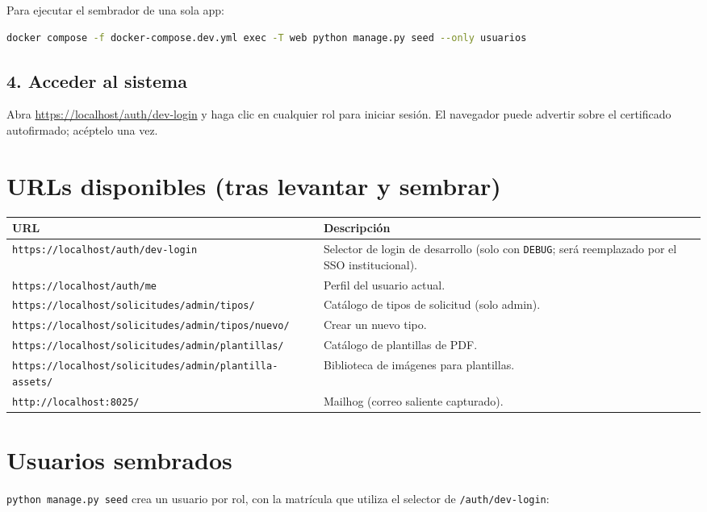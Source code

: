 \documentclass[12pt,letterpaper]{report}
\begin{document}
Para ejecutar el sembrador de una sola app:

\begin{lstlisting}[language=bash]
docker compose -f docker-compose.dev.yml exec -T web python manage.py seed --only usuarios
\end{lstlisting}

\subsection{4. Acceder al sistema}

Abra \url{https://localhost/auth/dev-login} y haga clic en cualquier rol para
iniciar sesión. El navegador puede advertir sobre el certificado autofirmado;
acéptelo una vez.

\section{URLs disponibles (tras levantar y sembrar)}

\begin{longtable}{L{7cm} L{7cm}}
\toprule
\textbf{URL} & \textbf{Descripción} \\
\midrule
\endhead
\texttt{https://localhost/auth/dev-login} & Selector de login de desarrollo
  (solo con \texttt{DEBUG}; será reemplazado por el SSO institucional). \\
\texttt{https://localhost/auth/me} & Perfil del usuario actual. \\
\texttt{https://localhost/solicitudes/admin/tipos/} & Catálogo de tipos de
  solicitud (solo admin). \\
\texttt{https://localhost/solicitudes/admin/tipos/nuevo/} & Crear un nuevo tipo. \\
\texttt{https://localhost/solicitudes/admin/plantillas/} & Catálogo de plantillas
  de PDF. \\
\texttt{https://localhost/solicitudes/admin/plantilla-assets/} & Biblioteca de
  imágenes para plantillas. \\
\texttt{http://localhost:8025/} & Mailhog (correo saliente capturado). \\
\bottomrule
\end{longtable}

\section{Usuarios sembrados}

\texttt{python manage.py seed} crea un usuario por rol, con la matrícula que
utiliza el selector de \texttt{/auth/dev-login}:
\end{document}
